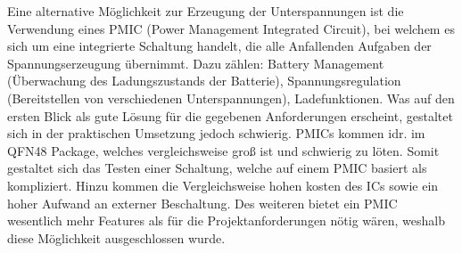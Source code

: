Eine alternative Möglichkeit zur Erzeugung der Unterspannungen ist die Verwendung eines PMIC (Power Management Integrated Circuit), bei welchem es sich um eine integrierte Schaltung handelt, die alle Anfallenden Aufgaben der Spannungserzeugung übernimmt. Dazu zählen: Battery Management (Überwachung des Ladungszustands der Batterie), Spannungsregulation (Bereitstellen von verschiedenen Unterspannungen), Ladefunktionen. Was auf den ersten Blick als gute Lösung für die gegebenen Anforderungen erscheint, gestaltet sich in der praktischen Umsetzung jedoch schwierig. PMICs kommen idr. im QFN48 Package, welches vergleichsweise groß ist und schwierig zu löten. Somit gestaltet sich das Testen einer Schaltung, welche auf einem PMIC basiert als kompliziert. Hinzu kommen die Vergleichsweise hohen kosten des ICs sowie ein hoher Aufwand an externer Beschaltung. Des weiteren bietet ein PMIC wesentlich mehr Features als für die Projektanforderungen nötig wären, weshalb diese Möglichkeit ausgeschlossen wurde.\\